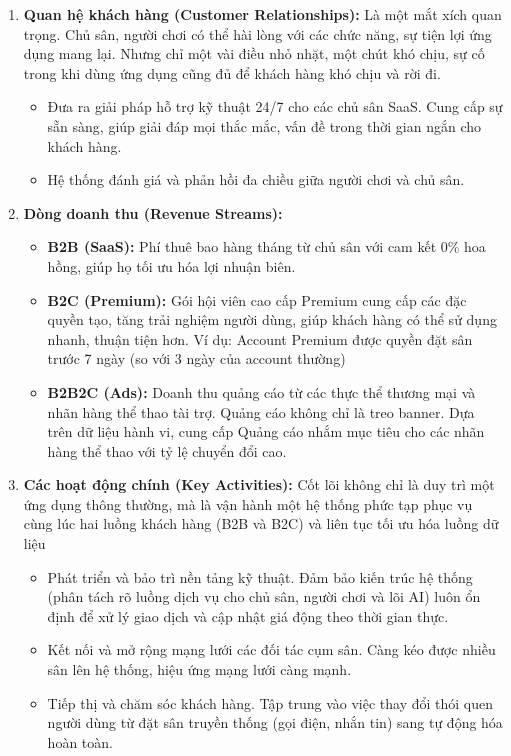 \begin{enumerate}
    \item \textbf{Quan hệ khách hàng (Customer Relationships):} Là một mắt xích quan trọng. Chủ sân, người chơi có thể hài lòng với các chức năng, sự tiện lợi ứng dụng mang lại. Nhưng chỉ một vài điều nhỏ nhặt, một chút khó chịu, sự cố trong khi dùng ứng dụng cũng đủ để khách hàng khó chịu và rời đi.
    \begin{itemize}
        \item Đưa ra giải pháp hỗ trợ kỹ thuật 24/7 cho các chủ sân SaaS. Cung cấp sự sẵn sàng, giúp giải đáp mọi thắc mắc, vấn đề trong thời gian ngắn cho khách hàng.
        \item Hệ thống đánh giá và phản hồi đa chiều giữa người chơi và chủ sân. 
    \end{itemize}

    \item \textbf{Dòng doanh thu (Revenue Streams):}
    \begin{itemize}
        \item \textbf{B2B (SaaS):} Phí thuê bao hàng tháng từ chủ sân với cam kết 0\% hoa hồng, giúp họ tối ưu hóa lợi nhuận biên.
        \item \textbf{B2C (Premium):} Gói hội viên cao cấp Premium cung cấp các đặc quyền tạo, tăng trải nghiệm người dùng, giúp khách hàng có thể sử dụng nhanh, thuận tiện hơn. Ví dụ: Account Premium được quyền đặt sân trước 7 ngày (so với 3 ngày của account thường)
        \item \textbf{B2B2C (Ads):} Doanh thu quảng cáo từ các thực thể thương mại và nhãn hàng thể thao tài trợ. Quảng cáo không chỉ là treo banner. Dựa trên dữ liệu hành vi, cung cấp Quảng cáo nhắm mục tiêu cho các nhãn hàng thể thao với tỷ lệ chuyển đổi cao.
    \end{itemize}

    \item \textbf{Các hoạt động chính (Key Activities):} Cốt lõi không chỉ là duy trì một ứng dụng thông thường, mà là vận hành một hệ thống phức tạp phục vụ cùng lúc hai luồng khách hàng (B2B và B2C) và liên tục tối ưu hóa luồng dữ liệu
    \begin{itemize}
        \item Phát triển và bảo trì nền tảng kỹ thuật. Đảm bảo kiến trúc hệ thống (phân tách rõ luồng dịch vụ cho chủ sân, người chơi và lõi AI) luôn ổn định để xử lý giao dịch và cập nhật giá động theo thời gian thực.
        \item Kết nối và mở rộng mạng lưới các đối tác cụm sân. Càng kéo được nhiều sân lên hệ thống, hiệu ứng mạng lưới càng mạnh.
        \item Tiếp thị và chăm sóc khách hàng. Tập trung vào việc thay đổi thói quen người dùng từ đặt sân truyền thống (gọi điện, nhắn tin) sang tự động hóa hoàn toàn.
    \end{itemize}


\end{enumerate}
